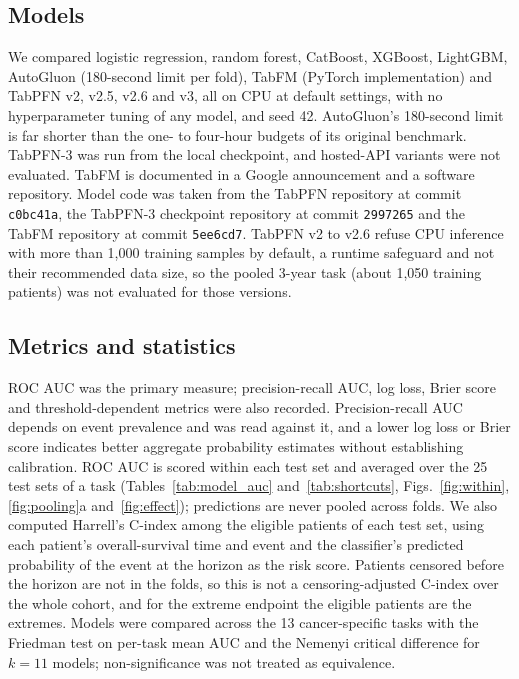 \subsection*{Models}
We compared logistic regression, random forest, CatBoost, XGBoost, LightGBM, AutoGluon (180-second limit per fold), TabFM (PyTorch implementation) and TabPFN v2, v2.5, v2.6 and v3, all on CPU at default settings, with no hyperparameter tuning of any model, and seed 42.\citep{breiman2001random,chen2016xgboost,ke2017lightgbm,prokhorenkova2018catboost,erickson2020autogluon,hollmann2025accurate,google2026tabfm,tabfmsoftware2026} AutoGluon's 180-second limit is far shorter than the one- to four-hour budgets of its original benchmark.\citep{erickson2020autogluon} TabPFN-3 was run from the local checkpoint, and hosted-API variants were not evaluated.\citep{priorlabs2026tabpfn3} TabFM is documented in a Google announcement and a software repository. Model code was taken from the TabPFN repository at commit \texttt{c0bc41a}, the TabPFN-3 checkpoint repository at commit \texttt{2997265} and the TabFM repository at commit \texttt{5ee6cd7}. TabPFN v2 to v2.6 refuse CPU inference with more than 1,000 training samples by default, a runtime safeguard and not their recommended data size, so the pooled 3-year task (about 1,050 training patients) was not evaluated for those versions.

\subsection*{Metrics and statistics}
ROC AUC was the primary measure; precision-recall AUC, log loss, Brier score and threshold-dependent metrics were also recorded. Precision-recall AUC depends on event prevalence and was read against it,\citep{saito2015precision} and a lower log loss or Brier score\citep{brier1950verification} indicates better aggregate probability estimates without establishing calibration.\citep{van2019calibration} ROC AUC is scored within each test set and averaged over the 25 test sets of a task (Tables~\ref{tab:model_auc} and~\ref{tab:shortcuts}, Figs.~\ref{fig:within}, \ref{fig:pooling}a and~\ref{fig:effect}); predictions are never pooled across folds. We also computed Harrell's C-index among the eligible patients of each test set, using each patient's overall-survival time and event and the classifier's predicted probability of the event at the horizon as the risk score. Patients censored before the horizon are not in the folds, so this is not a censoring-adjusted C-index over the whole cohort, and for the extreme endpoint the eligible patients are the extremes. Models were compared across the 13 cancer-specific tasks with the Friedman test on per-task mean AUC and the Nemenyi critical difference for $k = 11$ models;\citep{demsar2006statistical} non-significance was not treated as equivalence.

